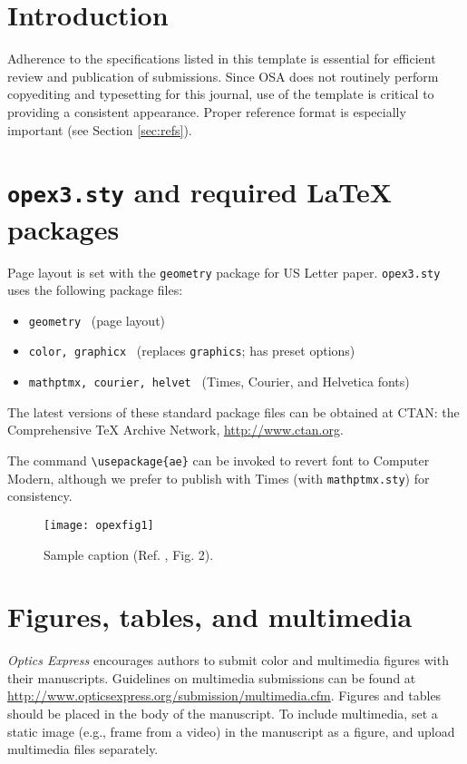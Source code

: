 \documentclass[10pt,letterpaper]{article}
\begin{document}
\section{Introduction}
Adherence to the specifications listed in this template is essential for efficient review and publication of submissions. Since OSA does not routinely perform copyediting and typesetting for this journal, use of the template is critical to providing a consistent appearance. Proper reference format is especially important (see Section \ref{sec:refs}).

\section{\texttt{opex3.sty} and required \LaTeX{} packages}
Page layout is set with the \texttt{geometry} package for US Letter paper. \texttt{opex3.sty} uses the following package files:

\begin{itemize}
\item \texttt{geometry} \ (page layout)
\item \texttt{color, graphicx} \ (replaces \texttt{graphics}; has preset options)
\item \texttt{mathptmx, courier, helvet} \ (Times, Courier, and Helvetica fonts) 
\end{itemize}

The latest versions of these standard package files can be obtained at CTAN: the Comprehensive TeX Archive Network, \url{http://www.ctan.org}.

\bigskip

\noindent The command \verb+\usepackage{ae}+ can be invoked to revert font to Computer Modern, although we prefer to publish with Times (with \texttt{mathptmx.sty}) for consistency.

\begin{figure}[htb]
\centering\texttt{[image: opexfig1]}
\caption{Sample caption (Ref. \cite{Oron03}, Fig. 2).}
\end{figure}

\section{Figures, tables, and multimedia}
\textit{Optics Express} encourages authors to submit color and multimedia figures with their manuscripts. Guidelines on multimedia submissions can be found at \mbox{\url{http://www.opticsexpress.org/submission/multimedia.cfm}}. Figures and tables should be placed in the body of the manuscript. To include multimedia, set a static image (e.g., frame from a video) in the manuscript as a figure, and upload multimedia files separately.
\end{document}
